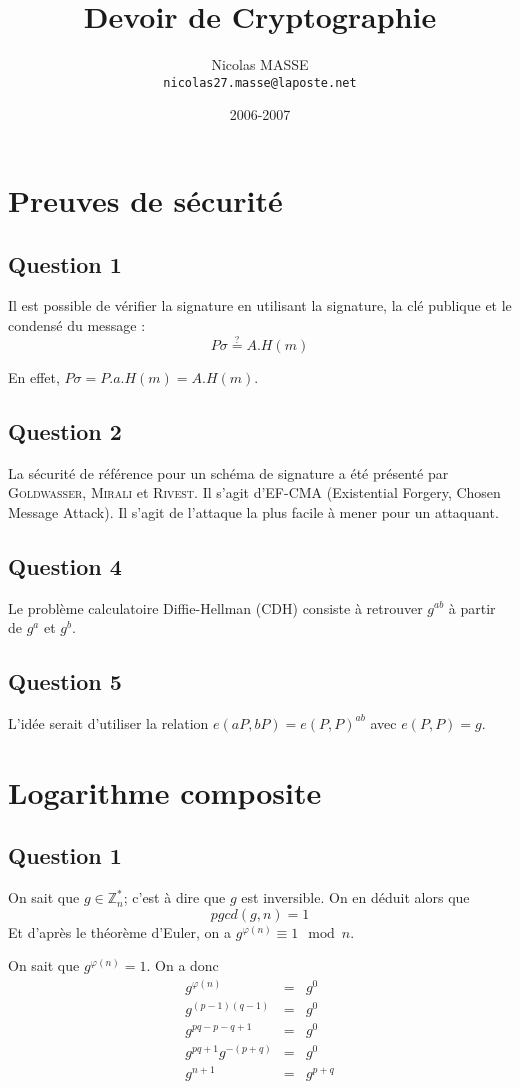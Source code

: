 \documentclass[a4paper,10pt,twocolumn]{article}
\title{Devoir de Cryptographie}
\author{Nicolas MASSE \\ \texttt{nicolas27.masse@laposte.net}}
\date{2006-2007}
\theoremstyle{break}
\newcommand{\Zn}[1]{\mathbb{Z}_{#1}}
\begin{document}
\maketitle

\section{Preuves de sécurité}

\subsection{Question 1}
Il est possible de vérifier la signature en utilisant la signature, la clé publique et le condensé du message :
$$ P\sigma \stackrel{?}{=} A.H(m) $$

En effet, $P\sigma = P.a.H(m) = A.H(m)$.
\subsection{Question 2}
La sécurité de référence pour un schéma de signature a été présenté par \textsc{Goldwasser}, \textsc{Mirali} 
et \textsc{Rivest}. Il s'agit d'EF-CMA (Existential Forgery, Chosen Message Attack). Il s'agit de l'attaque 
la plus facile à mener pour un attaquant.

\subsection{Question 4}
Le problème calculatoire Diffie-Hellman (CDH) consiste à retrouver $g^{ab}$ à partir de $g^a$ et $g^b$.

\subsection{Question 5}
L'idée serait d'utiliser la relation $e(aP,bP) = e(P,P)^{ab}$ avec $e(P,P) = g$.

\section{Logarithme composite}
\subsection{Question 1}
On sait que $g \in \Zn{n}^{*}$; c'est à dire que $g$ est inversible. On en déduit alors que 
 $$pgcd(g,n) = 1$$
Et d'après le théorème d'Euler, on a $g^{\varphi(n)} \equiv 1 \mod n$.

On sait que $g^{\varphi(n)} = 1$. On a donc 
\begin{eqnarray*}
 g^{\varphi(n)} & = & g^0 \\
 g^{(p-1)(q-1)} & = & g^0 \\
 g^{pq-p-q+1} & = & g^0 \\
 g^{pq+1} g^{-(p+q)} & = & g^0 \\
 g^{n+1} & = & g^{p+q}
\end{eqnarray*}
\end{document}
